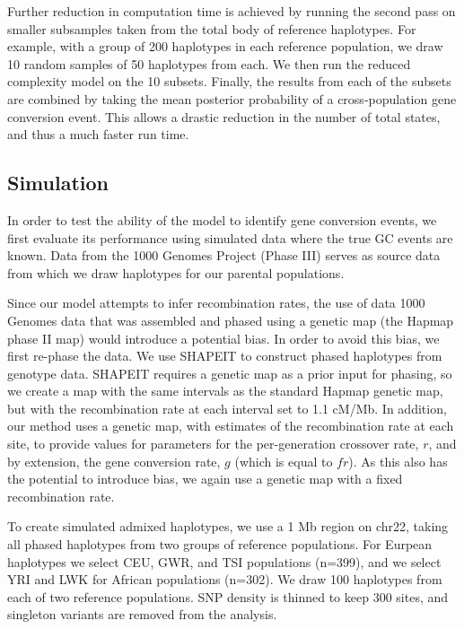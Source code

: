 Further reduction in computation time is achieved by running the second pass on smaller subsamples taken from the total body of reference haplotypes.
For example, with a group of 200 haplotypes in each reference population, we draw 10 random samples of 50 haplotypes from each.
We then run the reduced complexity model on the 10 subsets.
Finally, the results from each of the subsets are combined by taking the mean posterior probability of a cross-population gene conversion event.
This allows a drastic reduction in the number of total states, and thus a much faster run time.


\subsection{Simulation}
In order to test the ability of the model to identify gene conversion events, we first evaluate its performance using simulated data where the true GC events are known.
Data from the 1000 Genomes Project (Phase III\cite{1000G2015}) serves as source data from which we draw haplotypes for our parental populations.

Since our model attempts to infer recombination rates, the use of data 1000 Genomes data that was assembled and phased using a genetic map (the Hapmap phase II map\cite{hapmap2007}) would introduce a potential bias.
In order to avoid this bias, we first re-phase the data.
We use SHAPEIT\cite{Delaneau2013} to construct phased haplotypes from genotype data.
SHAPEIT requires a genetic map as a prior input for phasing, so we create a map with the same intervals as the standard Hapmap genetic map, but with the recombination rate at each interval set to 1.1 cM/Mb.
In addition, our method uses a genetic map, with estimates of the recombination rate at each site, to provide values for parameters for the per-generation crossover rate, $r$, and by extension, the gene conversion rate, $g$ (which is equal to $f r$).
As this also has the potential to introduce bias, we again use a genetic map with a fixed recombination rate.

To create simulated admixed haplotypes, we use a 1 Mb region on chr22, taking all phased haplotypes from two groups of reference populations.
For Eurpean haplotypes we select CEU, GWR, and TSI populations (n=399), and we select YRI and LWK for African populations (n=302).
We draw 100 haplotypes from each of two reference populations.
SNP density is thinned to keep 300 sites, and singleton variants are removed from the analysis.

